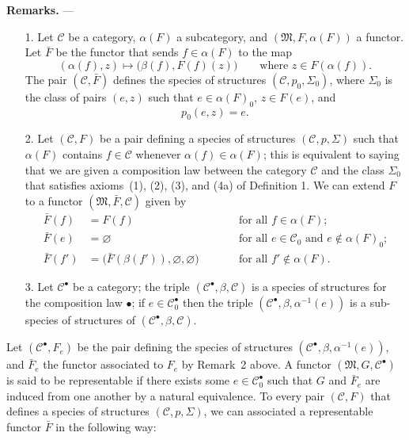 \documentclass[fleqn]{article}
\newenvironment{rmenv}[1]
  {\phantomsection\par\medskip\noindent\textbf{#1.}\rmfamily}
  {\par\medskip}
\newcommand{\oldpage}[1]{\marginpar{\footnotesize$\Big\vert$ \textit{p.~#1}}}
\newcommand{\CC}{\mathcal{C}}
\newcommand{\MM}{\mathfrak{M}}
\begin{document}
\begin{rmenv}{Remarks}
  ---
  \begin{enumerate}
    \item[1.]
      Let $\CC$ be a category, $\alpha(F)$ a subcategory, and $(\MM,F,\alpha(F))$ a functor.
      Let $\bar{F}$ be the functor that sends $f\in\alpha(F)$ to the map
      \[
        (\alpha(f),z)
        \longmapsto\big(\beta(f),F(f)(z)\big)
        \qquad\text{where $z\in F(\alpha(f))$.}
      \]
      The pair $(\CC,\bar{F})$ defines the species of structures $(\CC,p_0,\Sigma_0)$, where $\Sigma_0$ is the class of pairs $(e,z)$ such that $e\in\alpha(F)_0$, $z\in F(e)$, and
      \[
        p_0(e,z)=e.
      \]
    \item[2.]
      Let $(\CC,F)$ be a pair defining a species of structures $(\CC,p,\Sigma)$ such that $\alpha(F)$ contains $f\in\CC$ whenever $\alpha(f)\in\alpha(F)$;
      this is equivalent to saying that we are given a composition law between the category $\CC$ and the class $\Sigma_0$ that satisfies axioms~(1), (2), (3), and (4a) of Definition 1.
      We can extend $F$ to a functor $(\MM,\bar{F},\CC)$ given by
      \[
        \begin{aligned}
          \bar{F}(f)&=F(f)
          \qquad&&\text{for all $f\in\alpha(F)$;}
        \\\bar{F}(e)&=\varnothing
          \qquad&&\text{for all $e\in\CC_0$ and $e\not\in\alpha(F)_0$;}
        \\\bar{F}(f')&=\big(\bar{F}(\beta(f')),\varnothing,\varnothing)
          \qquad&&\text{for all $f'\not\in\alpha(F)$.}
        \end{aligned}
      \]
    \item[3.]
      Let $\CC^\bullet$ be a category;
      the triple $(\CC^\bullet,\beta,\CC)$ is a species of structures for the composition law $\bullet$;
      if $e\in\CC_0^\bullet$ then the triple $(\CC^\bullet,\beta,\alpha^{-1}(e))$ is a sub-species of structures \cite{3a} of $(\CC^\bullet,\beta,\CC)$.
  \end{enumerate}
\end{rmenv}

\oldpage{354}
Let $(\CC^\bullet,F_e)$ be the pair defining the species of structures $(\CC^\bullet,\beta,\alpha^{-1}(e))$, and $\bar{F}_e$ the functor associated to $F_e$ by Remark~2 above.
A functor $(\MM,G,\CC^\bullet)$ is said to be representable \cite{2} if there exists some $e\in\CC_0^\bullet$ such that $G$ and $\bar{F}_e$ are induced from one another by a natural equivalence.
To every pair $(\CC,F)$ that defines a species of structures $(\CC,p,\Sigma)$, we can associated a representable functor $\bar{F}$ in the following way:
\end{document}
